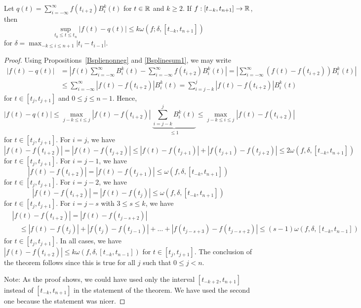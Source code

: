 \begin{theorem}
Let $\displaystyle q(t) = \sum_{i=-\infty}^\infty f(t_{i+2}) B_i^k(t)$ for
$t\in \mathbb{R}$ and $k\geq 2$.  If $f:[t_{-k},t_{n+1}] \to \mathbb{R}$, then 
\[
  \sup_{t_0 \leq t\leq t_n} |f(t) - q(t)|
  \leq k \omega(f; \delta, [t_{-k},t_{n+1}])
\]
for $\displaystyle \delta = \max_{-k\leq i \leq n+1} |t_i - t_{i-1}|$.
\label{SplineApprox}
\end{theorem}

\begin{proof}
Using Propositions~\ref{Bsplienonneg} and \ref{Bsplinesum1}, we may write
\begin{align*}
|f(t) - q(t)| &= \left| f(t) \sum_{i=-\infty}^\infty B_i^k(t)
- \sum_{i=-\infty}^\infty f(t_{i+2})B_i^k(t) \right|
= \left| \sum_{i=-\infty}^\infty \left( f(t) - f(t_{i+2})\right) B_i^k(t)
\right| \\
&\leq \sum_{i=-\infty}^\infty \left| f(t) - f(t_{i+2})\right| B_i^k(t)
= \sum_{i=j-k}^j \left| f(t) - f(t_{i+2})\right| B_i^k(t)
\end{align*}
for $t \in [t_j,t_{j+1}]$ and $0 \leq j \leq n-1$.  Hence,
\[
|f(t) - q(t)|
\leq \max_{j-k \leq i \leq j} \left| f(t) - f(t_{i+2})\right|
\  \underbrace{\sum_{i=j-k}^j B_i^k(t)}_{\leq 1}
\leq \max_{j-k \leq i \leq j}  \left| f(t) - f(t_{i+2})\right|
\]
for $t \in [t_j,t_{j+1}]$.
For $i = j$, we have
\[
\left| f(t) - f(t_{i+2})\right|
= \left| f(t) - f(t_{j+2})\right|
\leq \left| f(t) - f(t_{j+1})\right| + \left| f(t_{j+1}) - f(t_{j+2})\right|
\leq 2 \omega(f, \delta, [t_{-k},t_{n+1}])
\]
for $t \in [t_j,t_{j+1}]$.  For $i = j-1$, we have
\[
\left| f(t) - f(t_{i+2})\right|
= \left| f(t) - f(t_{j+1})\right|
\leq \omega(f, \delta, [t_{-k},t_{n+1}])
\]
for $t \in [t_j,t_{j+1}]$.  For $i = j-2$, we have
\[
\left| f(t) - f(t_{i+2})\right|
= \left| f(t) - f(t_j)\right| \leq \omega(f, \delta, [t_{-k},t_{n+1}])
\]
for $t \in [t_j,t_{j+1}]$.  For $i = j-s$ with $3\leq s \leq k$, we have
\begin{align*}
&\left| f(t) - f(t_{i+2})\right|
= \left| f(t) - f(t_{j-s+2})\right| \\
& \quad \leq \left| f(t) - f(t_j)\right| + \left| f(t_j) - f(t_{j-1})\right|
+ \ldots + \left| f(t_{j-s+3}) - f(t_{j-s+2})\right|
\leq (s-1) \omega(f, \delta, [t_{-k},t_{n-1}])
\end{align*}
for $t \in [t_j,t_{j+1}]$.  In all cases, we have
$\left| f(t) - f(t_{i+2})\right| \leq k \omega(f, \delta, [t_{-k},t_{n-1}])$
for $t \in [t_j,t_{j+1}]$.  The conclusion of the theorem follows
since this is true for all $j$ such that $0 \leq j < n$.

\noindent Note: As the proof shows, we could have used only the
interval $[t_{-k+2},t_{n+1}]$ instead of $[t_{-k},t_{n+1}]$ in the
statement of the theorem.  We have used the second one because the
statement was nicer.
\end{proof}

